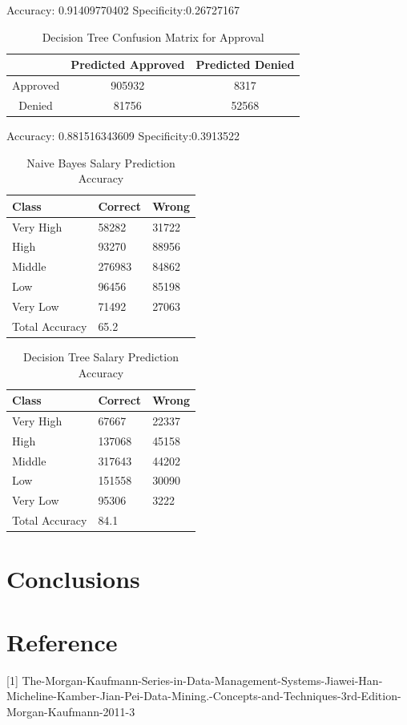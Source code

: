 \documentclass[sigconf]{acmart}
\begin{document}
Accuracy: 0.91409770402 \qquad Specificity:0.26727167


\begin{table}[h]
    \caption{Decision Tree Confusion Matrix for Approval}
    \centering
    \begin{tabular}{c| c |c}
        &Predicted Approved&Predicted Denied\\
        \hline
        Approved& 905932& 8317\\
        Denied  & 81756 & 52568\\
    \end{tabular}
\end{table}

Accuracy: 0.881516343609 \qquad Specificity:0.3913522

\begin{table}[h]
    \caption{Naive Bayes Salary Prediction Accuracy}
    \centering
    \begin{tabular}{l | l | l}
        Class & Correct & Wrong \\
        \hline
         Very High& 58282 &31722 \\
         High     & 93270 &88956 \\
         Middle   & 276983&84862 \\
         Low      & 96456 &85198 \\
         Very Low & 71492 &27063 \\
         \hline
         Total Accuracy & 65.2%
    \end{tabular}
    \label{tab:my_label}
\end{table}

\begin{table}[h]
    \caption{Decision Tree Salary Prediction Accuracy}
    \centering
    \begin{tabular}{l | l | l}
        Class & Correct & Wrong \\
        \hline
         Very High& 67667 &22337 \\
         High     & 137068&45158 \\
         Middle   & 317643&44202 \\
         Low      & 151558&30090 \\
         Very Low & 95306 &3222 \\
         \hline
         Total Accuracy & 84.1%
    \end{tabular}
    \label{tab:my_label}
\end{table}

\section{Conclusions}

\section*{Reference}
[1]  The-Morgan-Kaufmann-Series-in-Data-Management-Systems-Jiawei-Han-Micheline-Kamber-Jian-Pei-Data-Mining.-Concepts-and-Techniques-3rd-Edition-Morgan-Kaufmann-2011-3




\end{document}
